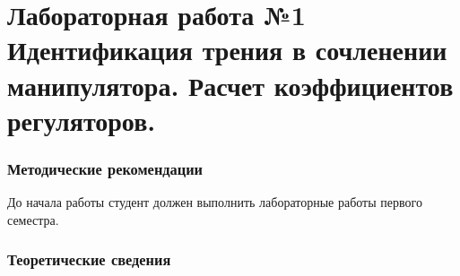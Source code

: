 \documentclass[12pt,a4paper,openany]{extarticle}
\begin{document}
\part*{Лабораторная работа №1\\ Идентификация трения в сочленении манипулятора. Расчет коэффициентов регуляторов.}
\section{Методические рекомендации}
\hspace*{\parindent}До начала работы студент должен выполнить лабораторные работы первого семестра.


\section{Теоретические сведения}






\end{document}
